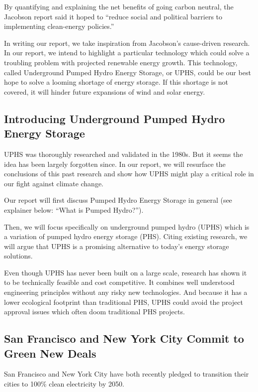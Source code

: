 \documentclass[hidelinks,12pt,a4paper]{article}
\begin{document}
By quantifying and explaining the net benefits of going carbon neutral, the Jacobson report said it hoped to “reduce social and political barriers to implementing clean-energy policies.” \cite{100PercCleanAndRenewableEnergyBy2050}

In writing our report, we take inspiration from Jacobson's cause-driven research. In our report, we intend to highlight a particular technology which could solve a troubling problem with projected renewable energy growth. This technology, called Underground Pumped Hydro Energy Storage, or UPHS, could be our best hope to solve a looming shortage of energy storage. If this shortage is not covered, it will hinder future expansions of wind and solar energy.

\subsection{Introducing Underground Pumped Hydro Energy Storage}
UPHS was thoroughly researched and validated in the 1980s. But it seems the idea has been largely forgotten since. In our report, we will resurface the conclusions of this past research and show how UPHS might play a critical role in our fight against climate change.

Our report will first discuss Pumped Hydro Energy Storage in general (see explainer below: “What is Pumped Hydro?”).

Then, we will focus specifically on underground pumped hydro (UPHS) which is a variation of pumped hydro energy storage (PHS). Citing existing research, we will argue that UPHS is a promising alternative to today's energy storage solutions.

Even though UPHS has never been built on a large scale, research has shown it to be technically feasible and cost competitive. It combines well understood engineering principles without any risky new technologies. And because it has a lower ecological footprint than traditional PHS, UPHS could avoid the project approval issues which often doom traditional PHS projects.

\subsection{San Francisco and New York City Commit to Green New Deals}
San Francisco and New York City have both recently pledged to transition their cities to 100\% clean electricity by 2050. \cite{SFNetZeroBy2050} \cite{ActionOnGlobalWarmingNYCsGreenNewDeal}
\end{document}
